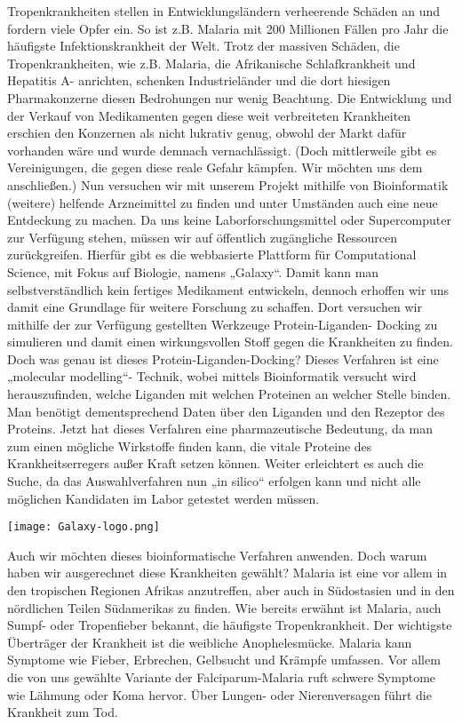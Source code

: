 \documentclass[11pt]{article}
\begin{document}
    Tropenkrankheiten stellen in Entwicklungsländern verheerende Schäden an und fordern viele Opfer ein. So ist z.B. Malaria mit 200 Millionen Fällen pro Jahr die häufigste Infektionskrankheit der Welt. Trotz der massiven Schäden, die Tropenkrankheiten, wie z.B. Malaria, die Afrikanische Schlafkrankheit und Hepatitis A- anrichten, schenken Industrieländer und die dort hiesigen Pharmakonzerne diesen Bedrohungen nur wenig Beachtung. Die Entwicklung und der Verkauf von Medikamenten gegen diese weit verbreiteten Krankheiten erschien den Konzernen als nicht lukrativ genug, obwohl der Markt dafür vorhanden wäre und wurde demnach vernachlässigt. (Doch mittlerweile gibt es Vereinigungen, die gegen diese reale Gefahr kämpfen. Wir möchten uns dem anschließen.)  Nun versuchen wir mit unserem Projekt mithilfe von Bioinformatik (weitere) helfende Arzneimittel zu finden und unter Umständen auch eine neue Entdeckung zu machen. Da uns keine Laborforschungsmittel oder Supercomputer zur Verfügung stehen, müssen wir auf öffentlich zugängliche Ressourcen zurückgreifen. Hierfür gibt es die webbasierte Plattform für Computational Science, mit Fokus auf Biologie, namens „Galaxy“. Damit kann man selbstverständlich kein fertiges Medikament entwickeln, dennoch erhoffen wir uns damit eine Grundlage für weitere Forschung zu schaffen. Dort versuchen wir mithilfe der zur Verfügung gestellten Werkzeuge Protein-Liganden- Docking zu simulieren und damit einen wirkungsvollen Stoff gegen die Krankheiten zu finden. Doch was genau ist dieses Protein-Liganden-Docking? Dieses Verfahren ist eine „molecular modelling“- Technik, wobei mittels Bioinformatik versucht wird herauszufinden, welche Liganden mit welchen Proteinen an welcher Stelle binden. Man benötigt dementsprechend Daten über den Liganden und den Rezeptor des Proteins. Jetzt hat dieses Verfahren eine pharmazeutische Bedeutung, da man zum einen mögliche Wirkstoffe finden kann, die vitale Proteine des Krankheitserregers außer Kraft setzen können. Weiter erleichtert es auch die Suche, da das Auswahlverfahren nun „in silico“ erfolgen kann und nicht alle möglichen Kandidaten im Labor getestet werden müssen.

    \texttt{[image: Galaxy-logo.png]}

    
    Auch wir möchten dieses bioinformatische Verfahren anwenden. Doch warum haben wir ausgerechnet diese Krankheiten gewählt? Malaria ist eine vor allem in den tropischen Regionen Afrikas anzutreffen, aber auch in Südostasien und in den nördlichen Teilen Südamerikas zu finden. Wie bereits erwähnt ist Malaria, auch Sumpf- oder Tropenfieber bekannt, die häufigste Tropenkrankheit. Der wichtigste Überträger der Krankheit ist die weibliche Anophelesmücke. Malaria kann Symptome wie Fieber, Erbrechen, Gelbsucht und Krämpfe umfassen. Vor allem die von uns gewählte Variante der Falciparum-Malaria ruft schwere Symptome wie Lähmung oder Koma hervor. Über Lungen- oder Nierenversagen führt die Krankheit zum Tod.
\end{document}
